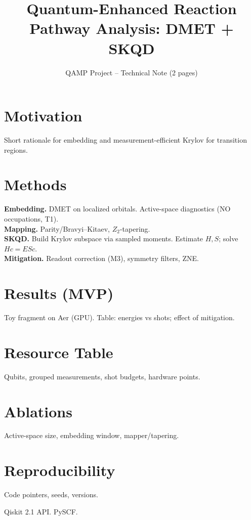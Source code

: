 \documentclass[10pt,a4paper]{article}
\title{Quantum-Enhanced Reaction Pathway Analysis: DMET + SKQD}
\author{QAMP Project -- Technical Note (2 pages)}
\date{}
\begin{document}
\maketitle
\section*{Motivation}
Short rationale for embedding and measurement-efficient Krylov for transition regions.

\section*{Methods}
\textbf{Embedding.} DMET on localized orbitals. Active-space diagnostics (NO occupations, T1).\\
\textbf{Mapping.} Parity/Bravyi--Kitaev, $Z_2$-tapering.\\
\textbf{SKQD.} Build Krylov subspace via sampled moments. Estimate $H,S$; solve $Hc=ESc$.\\
\textbf{Mitigation.} Readout correction (M3), symmetry filters, ZNE.

\section*{Results (MVP)}
Toy fragment on Aer (GPU). Table: energies vs shots; effect of mitigation.

\section*{Resource Table}
Qubits, grouped measurements, shot budgets, hardware points.

\section*{Ablations}
Active-space size, embedding window, mapper/tapering.

\section*{Reproducibility}
Code pointers, seeds, versions.


\begin{thebibliography}{9}
 Qiskit 2.1 API.
 PySCF.
\end{thebibliography}
\end{document}
